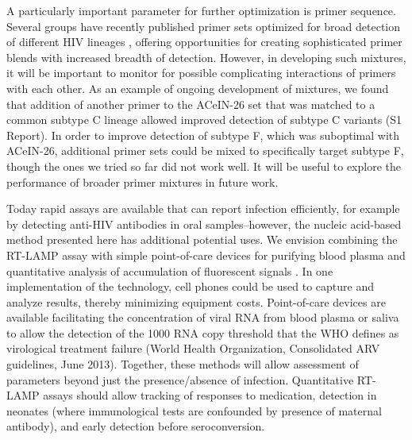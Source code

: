 \documentclass[../sherrill-Mix_thesis.tex]{subfiles}
\begin{document}
	A particularly important parameter for further optimization is primer sequence. Several groups have recently published primer sets optimized for broad detection of different HIV lineages \citep{Zeng2014,Hosaka2009}, offering opportunities for creating sophisticated primer blends with increased breadth of detection. However, in developing such mixtures, it will be important to monitor for possible complicating interactions of primers with each other. As an example of ongoing development of mixtures, we found that addition of another primer to the ACeIN-26 set that was matched to a common subtype C lineage allowed improved detection of subtype C variants (S1 Report). In order to improve detection of subtype F, which was suboptimal with ACeIN-26, additional primer sets could be mixed to specifically target subtype F, though the ones we tried so far did not work well. It will be useful to explore the performance of broader primer mixtures in future work.

	Today rapid assays are available that can report infection efficiently, for example by detecting anti-HIV antibodies in oral samples--however, the nucleic acid-based method presented here has additional potential uses. We envision combining the RT-LAMP assay with simple point-of-care devices for purifying blood plasma \citep{Liu2013} and quantitative analysis of accumulation of fluorescent signals \citep{Liu2011}. In one implementation of the technology, cell phones could be used to capture and analyze results, thereby minimizing equipment costs. Point-of-care devices are available facilitating the concentration of viral RNA from blood plasma or saliva \citep{Liu2011} to allow the detection of the 1000 RNA copy threshold that the WHO defines as virological treatment failure (World Health Organization, Consolidated ARV guidelines, June 2013). Together, these methods will allow assessment of parameters beyond just the presence/absence of infection. Quantitative RT-LAMP assays should allow tracking of responses to medication, detection in neonates (where immunological tests are confounded by presence of maternal antibody), and early detection before seroconversion.
\end{document}
